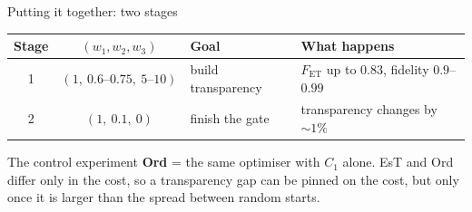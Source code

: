 \begin{frame}{Putting it together: two stages}
  \vspace{1.2em}
  \begin{center}
  \small
  \renewcommand{\arraystretch}{1.6}
  \begin{tabular}{@{}c c l l@{}}
    \textbf{Stage} & $(w_1, w_2, w_3)$ & \textbf{Goal} & \textbf{What happens} \\
    \hline
    1 & $(1,\ 0.6\text{--}0.75,\ 5\text{--}10)$ & build transparency
      & $F_{\mathrm{ET}}$ up to $0.83$, fidelity $0.9$--$0.99$ \\
    2 & $(1,\ 0.1,\ 0)$ & finish the gate
      & transparency changes by $\sim 1\%$ \\
    \hline
  \end{tabular}
  \end{center}

  \vspace{1.6em}
  \begin{block}{The control experiment}
    \textbf{Ord} = the same optimiser with $C_1$ alone. EsT and Ord differ only in the cost,
    so a transparency gap can be pinned on the cost, but only once it is larger than the
    spread between random starts.
  \end{block}


\end{frame}
